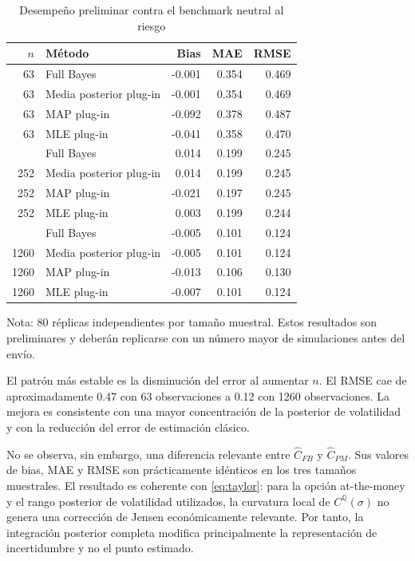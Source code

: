\documentclass[12pt,letterpaper]{article}
\newcommand{\Qmeasure}{\mathbb{Q}}
\begin{document}
\begin{table}[H]
\centering
\caption{Desempeño preliminar contra el benchmark neutral al riesgo}
\label{tab:pilot}
\begin{tabular}{rlrrr}
\toprule
$n$ & Método & Bias & MAE & RMSE \\
\midrule
63 & Full Bayes & -0.001 & 0.354 & 0.469 \\
63 & Media posterior plug-in & -0.001 & 0.354 & 0.469 \\
63 & MAP plug-in & -0.092 & 0.378 & 0.487 \\
63 & MLE plug-in & -0.041 & 0.358 & 0.470 \\
\addlinespace
252 & Full Bayes & 0.014 & 0.199 & 0.245 \\
252 & Media posterior plug-in & 0.014 & 0.199 & 0.245 \\
252 & MAP plug-in & -0.021 & 0.197 & 0.245 \\
252 & MLE plug-in & 0.003 & 0.199 & 0.244 \\
\addlinespace
1260 & Full Bayes & -0.005 & 0.101 & 0.124 \\
1260 & Media posterior plug-in & -0.005 & 0.101 & 0.124 \\
1260 & MAP plug-in & -0.013 & 0.106 & 0.130 \\
1260 & MLE plug-in & -0.007 & 0.101 & 0.124 \\
\bottomrule
\end{tabular}

\vspace{0.15cm}
\footnotesize Nota: 80 réplicas independientes por tamaño muestral. Estos resultados son preliminares y deberán replicarse con un número mayor de simulaciones antes del envío.
\end{table}

El patrón más estable es la disminución del error al aumentar $n$. El RMSE cae de aproximadamente 0.47 con 63 observaciones a 0.12 con 1260 observaciones. La mejora es consistente con una mayor concentración de la posterior de volatilidad y con la reducción del error de estimación clásico.

No se observa, sin embargo, una diferencia relevante entre $\widehat C_{FB}$ y $\widehat C_{PM}$. Sus valores de bias, MAE y RMSE son prácticamente idénticos en los tres tamaños muestrales. El resultado es coherente con \eqref{eq:taylor}: para la opción at-the-money y el rango posterior de volatilidad utilizados, la curvatura local de $C^{\Qmeasure}(\sigma)$ no genera una corrección de Jensen económicamente relevante. Por tanto, la integración posterior completa modifica principalmente la representación de incertidumbre y no el punto estimado.
\end{document}
